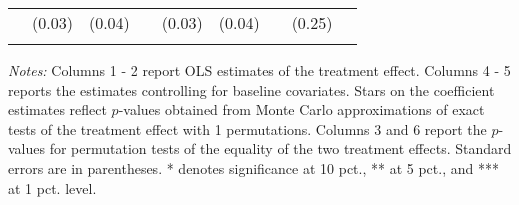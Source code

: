 \begin{table}[htbp]
{\begin{threeparttable}
\begin{tabular}{l*{8}{c}}
          &   (0.03)&   (0.04)&         &   (0.03)&   (0.04)&         &   (0.25)&         \\
          &         &         &         &         &         &         &         &         \\
\bottomrule \end{tabular} \begin{tablenotes}[flushleft] \footnotesize \item \emph{Notes:} Columns 1 - 2 report OLS estimates of the treatment effect. Columns 4 - 5 reports the estimates controlling for baseline covariates. Stars on the coefficient estimates reflect \(p\)-values obtained from Monte Carlo approximations of exact tests of the treatment effect with 1 permutations. Columns 3 and 6 report the \(p\)-values for permutation tests of the equality of the two treatment effects. Standard errors are in parentheses. * denotes significance at 10 pct., ** at 5 pct., and *** at 1 pct. level. \end{tablenotes} \end{threeparttable} } \end{table}

